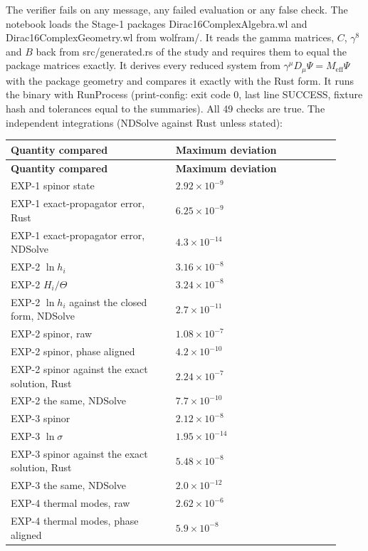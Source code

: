 \documentclass[11pt]{article}
\begin{document}
The verifier fails on any message, any failed evaluation or any false check. The notebook loads the Stage-1 packages Dirac16ComplexAlgebra.wl and Dirac16ComplexGeometry.wl from wolfram/. It reads the gamma matrices, $C$, $\gamma^8$ and $B$ back from src/generated.rs of the study and requires them to equal the package matrices exactly. It derives every reduced system from $\gamma^\mu D_\mu\Psi=M_{\mathrm{eff}}\Psi$ with the package geometry and compares it exactly with the Rust form. It runs the binary with RunProcess (print-config: exit code 0, last line SUCCESS, fixture hash and tolerances equal to the summaries). All 49 checks are true. The independent integrations (NDSolve against Rust unless stated):

\begin{longtable}{@{}p{0.460\linewidth}p{0.460\linewidth}@{}}
\toprule
\textbf{Quantity compared} & \textbf{Maximum deviation} \\
\midrule
\endfirsthead
\toprule
\textbf{Quantity compared} & \textbf{Maximum deviation} \\
\midrule
\endhead
EXP-1 spinor state & $2.92\times10^{-9}$ \\
EXP-1 exact-propagator error, Rust & $6.25\times10^{-9}$ \\
EXP-1 exact-propagator error, NDSolve & $4.3\times10^{-14}$ \\
EXP-2 $\ln h_i$ & $3.16\times10^{-8}$ \\
EXP-2 $H_i/\Theta$ & $3.24\times10^{-8}$ \\
EXP-2 $\ln h_i$ against the closed form, NDSolve & $2.7\times10^{-11}$ \\
EXP-2 spinor, raw & $1.08\times10^{-7}$ \\
EXP-2 spinor, phase aligned & $4.2\times10^{-10}$ \\
EXP-2 spinor against the exact solution, Rust & $2.24\times10^{-7}$ \\
EXP-2 the same, NDSolve & $7.7\times10^{-10}$ \\
EXP-3 spinor & $2.12\times10^{-8}$ \\
EXP-3 $\ln\sigma$ & $1.95\times10^{-14}$ \\
EXP-3 spinor against the exact solution, Rust & $5.48\times10^{-8}$ \\
EXP-3 the same, NDSolve & $2.0\times10^{-12}$ \\
EXP-4 thermal modes, raw & $2.62\times10^{-6}$ \\
EXP-4 thermal modes, phase aligned & $5.9\times10^{-8}$ \\

\end{longtable}
\end{document}
